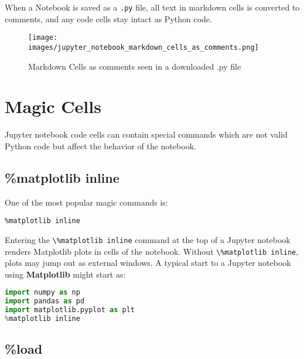 \documentclass{book}
\makeatletter
\def\maxwidth{\ifdim\Gin@nat@width>\linewidth\linewidth
\else\Gin@nat@width\fi}
\let\Oldincludegraphics\includegraphics
\renewcommand{\includegraphics}[1]{\Oldincludegraphics[width=.8\maxwidth]{#1}}
\newcommand{\passthrough}[1]{#1}
\makeatother
\begin{document}
When a Notebook is saved as a \passthrough{\lstinline!.py!} file, all
text in markdown cells is converted to comments, and any code cells stay
intact as Python code.

\begin{figure}
\centering
\texttt{[image: images/jupyter\_notebook\_markdown\_cells\_as\_comments.png]}
\caption{Markdown Cells as comments seen in a downloaded .py file}
\end{figure}
    




    
        \hypertarget{magic-cells}{%
\section{Magic Cells}\label{magic-cells}}
    




    
        Jupyter notebook code cells can contain special commands which are not
valid Python code but affect the behavior of the notebook.
    




    
        \hypertarget{matplotlib-inline}{%
\subsection{\%matplotlib inline}\label{matplotlib-inline}}

One of the most popular magic commands is:

\begin{lstlisting}
%matplotlib inline
\end{lstlisting}

Entering the \passthrough{\lstinline!\%matplotlib inline!} command at
the top of a Jupyter notebook renders Matplotlib plots in cells of the
notebook. Without \passthrough{\lstinline!\%matplotlib inline!}, plots
may jump out as external windows. A typical start to a Jupyter notebook
using \textbf{Matplotlib} might start as:

\begin{lstlisting}[language=Python]
import numpy as np
import pandas as pd
import matplotlib.pyplot as plt
%matplotlib inline
\end{lstlisting}
    




    
        \hypertarget{load}{%
\subsection{\%load}\label{load}}
\end{document}

